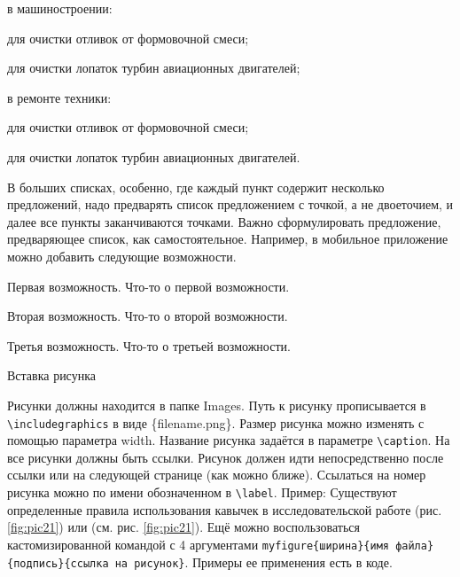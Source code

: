 \documentclass{report}
\begin{document}
\begin{enummarker}
  \item в машиностроении:
    \begin{enumarabic}
        \item для очистки отливок от формовочной смеси;
        \item для очистки лопаток турбин авиационных двигателей;   
    \end{enumarabic}
  \item в ремонте техники:
    \begin{enumarabic}
        \item для очистки отливок от формовочной смеси;
        \item для очистки лопаток турбин авиационных двигателей.  
    \end{enumarabic}
\end{enummarker}


В больших списках,  особенно, где каждый пункт содержит несколько 
предложений, надо предварять список предложением с точкой, а не двоеточием, и далее все пункты заканчиваются точками. Важно сформулировать предложение, предваряющее список, как самостоятельное. Например, в мобильное приложение можно добавить следующие возможности. 
\begin{enummarker}
\item Первая возможность. Что-то о первой возможности.
\item Вторая возможность. Что-то о второй возможности.
\item Третья возможность. Что-то о третьей возможности.
\end{enummarker}


Вставка рисунка

Рисунки должны находится в папке Images. Путь к рисунку прописывается в \verb|\includegraphics|  в виде \{filename.png\}. Размер рисунка можно изменять с помощью параметра width. Название рисунка задаётся в параметре \verb|\caption|. На все рисунки должны быть ссылки. Рисунок должен идти непосредственно после ссылки или на следующей странице (как можно ближе). Ссылаться на номер рисунка можно по имени обозначенном в \verb|\label|. Пример: Существуют определенные правила использования кавычек в исследовательской работе (рис. \ref{fig:pic21}) \break или (см. рис. \ref{fig:pic21}). Ещё можно воспользоваться кастомизированной командой с 4 аргументами \verb|myfigure{ширина}{имя файла}{подпись}{ссылка на рисунок}|. Примеры ее применения есть в коде.

\end{document}
